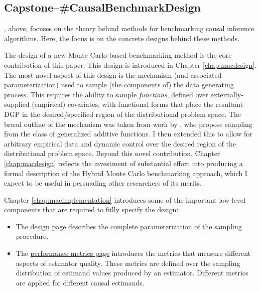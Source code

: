 \documentclass[../main.tex]{subfiles}
\begin{document}
\subsection*{\textbf{Capstone--\#CausalBenchmarkDesign}}
\label{lo:CausalBenchmarkDesign}

, above, focuses on the theory behind methods for benchmarking causal inference algorithms. Here, the focus is on the concrete designs behind these methods.

\vspace{\baselineskip}

The design of a new Monte Carlo-based benchmarking method is the core contribution of this paper. This design is introduced in Chapter \ref{chap:macdesign}. The most novel aspect of this design is the mechanism (and associated parameterization) used to sample (the components of) the data generating process. This requires the ability to sample \textit{functions}, defined over externally-supplied (empirical) covariates, with functional forms that place the resultant DGP in the desired/specified region of the distributional problem space. The broad outline of the mechanism was taken from work by \textcite{Dorie2019Automated1}, who propose sampling from the class of generalized additive functions. I then extended this to allow for arbitrary empirical data and dynamic control over the desired region of the distributional problem space. Beyond this novel contribution, Chapter \ref{chap:macdesign} reflects the investment of substantial effort into producing a formal description of the Hybrid Monte Carlo benchmarking approach, which I expect to be useful in persuading other researchers of its merits.

\vspace{\baselineskip}

Chapter \ref{chap:macimplementation} introduces some of the important low-level components that are required to fully specify the design:

\begin{itemize}

    \item The \href{\RTDurl/design.html}{design page} describes the complete parameterization of the sampling procedure.
    
    \item The \href{\RTDurl/reference/modeling/performance-metrics.html}{performance metrics page} introduces the metrics that measure different aspects of estimator quality. These metrics are defined over the sampling distribution of estimand values produced by an estimator. Different metrics are applied for different causal estimands.
    
\end{itemize}
\end{document}
